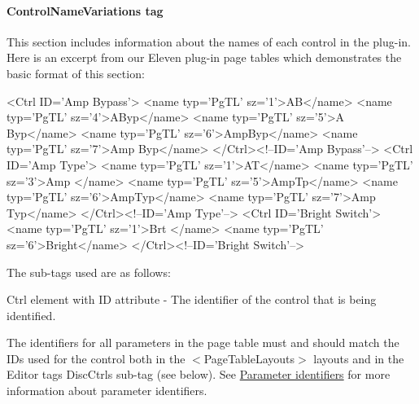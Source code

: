 \hypertarget{a00363_subsubsection_controlnamesvariations_tag}{}\paragraph{Control\+Name\+Variations tag}\label{a00363_subsubsection_controlnamesvariations_tag}
This section includes information about the names of each control in the plug-\/in. Here is an excerpt from our Eleven plug-\/in page tables which demonstrates the basic format of this section\+:


\begin{DoxyCode}
<Ctrl ID=\textcolor{stringliteral}{'Amp Bypass'}>
    <name typ=\textcolor{stringliteral}{'PgTL'} sz=\textcolor{charliteral}{'1'}>AB</name>
    <name typ=\textcolor{stringliteral}{'PgTL'} sz=\textcolor{charliteral}{'4'}>AByp</name>
    <name typ=\textcolor{stringliteral}{'PgTL'} sz=\textcolor{charliteral}{'5'}>A Byp</name>
    <name typ=\textcolor{stringliteral}{'PgTL'} sz=\textcolor{charliteral}{'6'}>AmpByp</name>
    <name typ=\textcolor{stringliteral}{'PgTL'} sz=\textcolor{charliteral}{'7'}>Amp Byp</name>
</Ctrl><!--ID=\textcolor{stringliteral}{'Amp Bypass'}-->
<Ctrl ID=\textcolor{stringliteral}{'Amp Type'}>
    <name typ=\textcolor{stringliteral}{'PgTL'} sz=\textcolor{charliteral}{'1'}>AT</name>
    <name typ=\textcolor{stringliteral}{'PgTL'} sz=\textcolor{charliteral}{'3'}>Amp </name>
    <name typ=\textcolor{stringliteral}{'PgTL'} sz=\textcolor{charliteral}{'5'}>AmpTp</name>
    <name typ=\textcolor{stringliteral}{'PgTL'} sz=\textcolor{charliteral}{'6'}>AmpTyp</name>
    <name typ=\textcolor{stringliteral}{'PgTL'} sz=\textcolor{charliteral}{'7'}>Amp Typ</name>
</Ctrl><!--ID=\textcolor{stringliteral}{'Amp Type'}-->
<Ctrl ID=\textcolor{stringliteral}{'Bright Switch'}>
    <name typ=\textcolor{stringliteral}{'PgTL'} sz=\textcolor{charliteral}{'1'}>Brt </name>
    <name typ=\textcolor{stringliteral}{'PgTL'} sz=\textcolor{charliteral}{'6'}>Bright</name>
</Ctrl><!--ID=\textcolor{stringliteral}{'Bright Switch'}-->
\end{DoxyCode}


The sub-\/tags used are as follows\+:

{\ttfamily Ctrl} element with {\ttfamily I\+D} attribute -\/ The identifier of the control that is being identified.

The identifiers for all parameters in the page table must and should match the I\+Ds used for the control both in the $<$Page\+Table\+Layouts$>$ layouts and in the {\ttfamily Editor} tag\textquotesingle{}s {\ttfamily Disc\+Ctrls} sub-\/tag (see below). See \hyperlink{a00363_subsection_parameter_identifiers}{Parameter identifiers} for more information about parameter identifiers.

